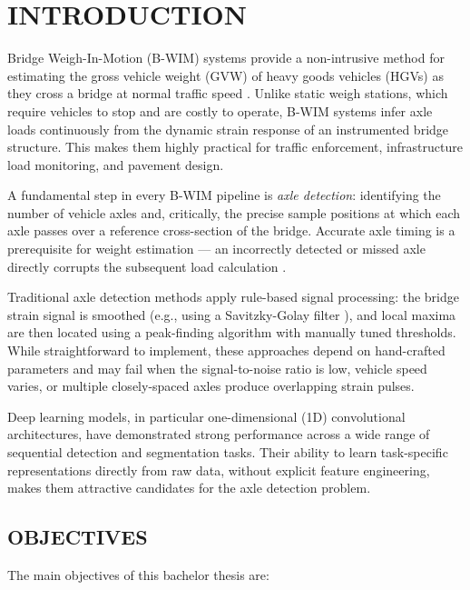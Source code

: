 \chapter{INTRODUCTION}

Bridge Weigh-In-Motion (B-WIM) systems provide a non-intrusive method for
estimating the gross vehicle weight (GVW) of heavy goods vehicles (HGVs) as they
cross a bridge at normal traffic speed \cite{Moses1979}. Unlike static weigh
stations, which require vehicles to stop and are costly to operate, B-WIM systems
infer axle loads continuously from the dynamic strain response of an instrumented
bridge structure. This makes them highly practical for traffic enforcement,
infrastructure load monitoring, and pavement design.

A fundamental step in every B-WIM pipeline is \emph{axle detection}: identifying
the number of vehicle axles and, critically, the precise sample positions at
which each axle passes over a reference cross-section of the bridge. Accurate
axle timing is a prerequisite for weight estimation --- an incorrectly detected
or missed axle directly corrupts the subsequent load calculation
\cite{Soberl2025}.

Traditional axle detection methods apply rule-based signal processing: the bridge
strain signal is smoothed (e.g., using a Savitzky-Golay filter
\cite{SavitzkyGolay1964}), and local maxima are then located using a peak-finding
algorithm with manually tuned thresholds. While straightforward to implement,
these approaches depend on hand-crafted parameters and may fail when the
signal-to-noise ratio is low, vehicle speed varies, or multiple closely-spaced
axles produce overlapping strain pulses.

Deep learning models, in particular one-dimensional (1D) convolutional
architectures, have demonstrated strong performance across a wide range of
sequential detection and segmentation tasks. Their ability to learn
task-specific representations directly from raw data, without explicit feature
engineering, makes them attractive candidates for the axle detection problem.

\section{OBJECTIVES}

The main objectives of this bachelor thesis are:

